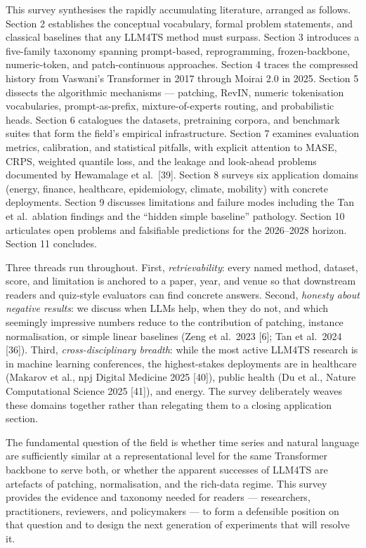 This survey synthesises the rapidly accumulating literature, arranged as follows. Section 2 establishes the conceptual vocabulary, formal problem statements, and classical baselines that any LLM4TS method must surpass. Section 3 introduces a five-family taxonomy spanning prompt-based, reprogramming, frozen-backbone, numeric-token, and patch-continuous approaches. Section 4 traces the compressed history from Vaswani's Transformer in 2017 through Moirai 2.0 in 2025. Section 5 dissects the algorithmic mechanisms --- patching, RevIN, numeric tokenisation vocabularies, prompt-as-prefix, mixture-of-experts routing, and probabilistic heads. Section 6 catalogues the datasets, pretraining corpora, and benchmark suites that form the field's empirical infrastructure. Section 7 examines evaluation metrics, calibration, and statistical pitfalls, with explicit attention to MASE, CRPS, weighted quantile loss, and the leakage and look-ahead problems documented by Hewamalage et al.~{[}39{]}. Section 8 surveys six application domains (energy, finance, healthcare, epidemiology, climate, mobility) with concrete deployments. Section 9 discusses limitations and failure modes including the Tan et al.~ablation findings and the ``hidden simple baseline'' pathology. Section 10 articulates open problems and falsifiable predictions for the 2026--2028 horizon. Section 11 concludes.

Three threads run throughout. First, \emph{retrievability}: every named method, dataset, score, and limitation is anchored to a paper, year, and venue so that downstream readers and quiz-style evaluators can find concrete answers. Second, \emph{honesty about negative results}: we discuss when LLMs help, when they do not, and which seemingly impressive numbers reduce to the contribution of patching, instance normalisation, or simple linear baselines (Zeng et al.~2023 {[}6{]}; Tan et al.~2024 {[}36{]}). Third, \emph{cross-disciplinary breadth}: while the most active LLM4TS research is in machine learning conferences, the highest-stakes deployments are in healthcare (Makarov et al., npj Digital Medicine 2025 {[}40{]}), public health (Du et al., Nature Computational Science 2025 {[}41{]}), and energy. The survey deliberately weaves these domains together rather than relegating them to a closing application section.

The fundamental question of the field is whether time series and natural language are sufficiently similar at a representational level for the same Transformer backbone to serve both, or whether the apparent successes of LLM4TS are artefacts of patching, normalisation, and the rich-data regime. This survey provides the evidence and taxonomy needed for readers --- researchers, practitioners, reviewers, and policymakers --- to form a defensible position on that question and to design the next generation of experiments that will resolve it.

